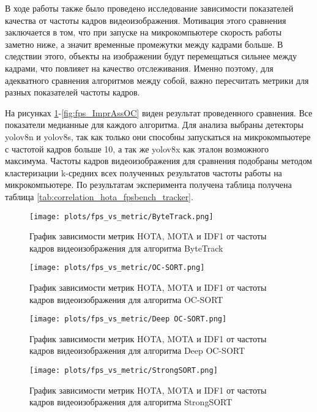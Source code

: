 В ходе работы также было проведено исследование зависимости показателей качества от частоты кадров видеоизображения. 
Мотивация этого сравнения заключается в том, что при запуске на микрокомпьютере скорость работы заметно ниже, а значит временные промежутки между кадрами больше. 
В следствии этого, объекты на изображении будут перемещаться сильнее между кадрами, что повлияет на качество отслеживания. 
Именно поэтому, для адекватного сравнения алгоритмов между собой, важно пересчитать метрики для разных показателей частоты кадров. 

На рисунках \ref{fig:fps_ByteTrack}-\ref{fig:fps_ImprAssOC} виден результат проведенного сравнения. 
Все показатели медианные для каждого алгоритма. 
Для анализа выбраны детекторы yolov8n и yolov8s, так как только они способны запускаться на микрокомпьютере с частотой кадров больше 10, а так же yolov8x как эталон возможного максимума.
Частоты кадров видеоизображения для сравнения подобраны методом кластеризации k-средних всех полученных результатов частоты работы на микрокомпьютере.
По результатам эксперимента получена таблица получена таблица \ref{tab:correlation_hota_fpsbench_tracker}. 


\begin{figure}[ht]
    \centering
    \texttt{[image: plots/fps\_vs\_metric/ByteTrack.png]}
    \caption{График зависимости метрик HOTA, MOTA и IDF1 от частоты кадров видеоизображения для алгоритма ByteTrack}
    \label{fig:fps_ByteTrack}
\end{figure}

\begin{figure}[ht]
    \centering
    \texttt{[image: plots/fps\_vs\_metric/OC-SORT.png]}
    \caption{График зависимости метрик HOTA, MOTA и IDF1 от частоты кадров видеоизображения для алгоритма OC-SORT}
    \label{fig:fps_OC-SORT}
\end{figure}

\begin{figure}[ht]
    \centering
    \texttt{[image: plots/fps\_vs\_metric/Deep OC-SORT.png]}
    \caption{График зависимости метрик HOTA, MOTA и IDF1 от частоты кадров видеоизображения для алгоритма Deep OC-SORT}
    \label{fig:fps_Deep OC-SORT}
\end{figure}

\begin{figure}[ht]
    \centering
    \texttt{[image: plots/fps\_vs\_metric/StrongSORT.png]}
    \caption{График зависимости метрик HOTA, MOTA и IDF1 от частоты кадров видеоизображения для алгоритма StrongSORT}
    \label{fig:fps_StrongSORT}
\end{figure}

